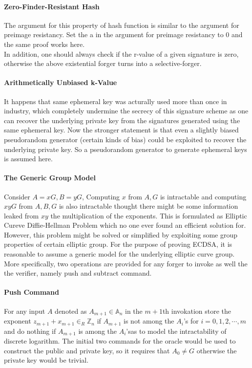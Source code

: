 \documentclass[12]{article}
\begin{document}
\paragraph{Zero-Finder-Resistant Hash} The argument for this property of hash function is similar to the argument for preimage resistancy. Set the a in the argument for preimage resistancy to 0 and the same proof works here.\\

In addition, one should always check if the r-value of a given signature is zero, otherwise the above existential forger turns into a selective-forger.

\paragraph{Arithmetically Unbiased k-Value}
It happens that same ephemeral key was acturally used more than once in industry, which completely undermine the secrecy of this signature scheme as one can recover the underlying private key from the signatures generated using the same ephemeral key.
Now the stronger statement is that even a slightly biased pseudorandom generator (certain kinds of bias) could be exploited to recover the underlying private key.
So a pseudorandom generator to generate ephemeral keys is assumed here.

\paragraph{The Generic Group Model}
Consider $A=xG,B=yG$, Computing $x$ from $A,G$ is intractable and computing $xyG$ from $A,B,G$ is also intractable thought there might be some information leaked from $xy$ the multiplication of the exponents. This is formulated as Elliptic Cureve Diffie-Hellman Problem which no one ever found an efficient solution for. However, this problem might be solved or simplified by exploiting some group properties of certain elliptic group. For the purpose of proving ECDSA, it is reasonable to assume a generic model for the underlying elliptic curve group. More specifically, two operations are provided for any forger to invoke as well the the verifier, namely push and subtract command.\\
\paragraph{Push Command}
For any input $A$ denoted as $A_{m+1}\in \mathbb{A}_n$ in the $m+1$th invokation store the exponent $z_{m+1}+x_{m+1}\in_R\mathbb{Z}_n$ if $A_{m+1}$ is not among the $A_i$'s for $i=0,1,2,\cdots,m$ and do nothing if $A_{m+1}$ is among the $A_i$'sas to model the intractability of discrete logarithm. The initial two commands for the oracle would be used to construct the public and private key, so it requires that $A_0\neq G$ otherwise the private key would be trivial.
\end{document}
